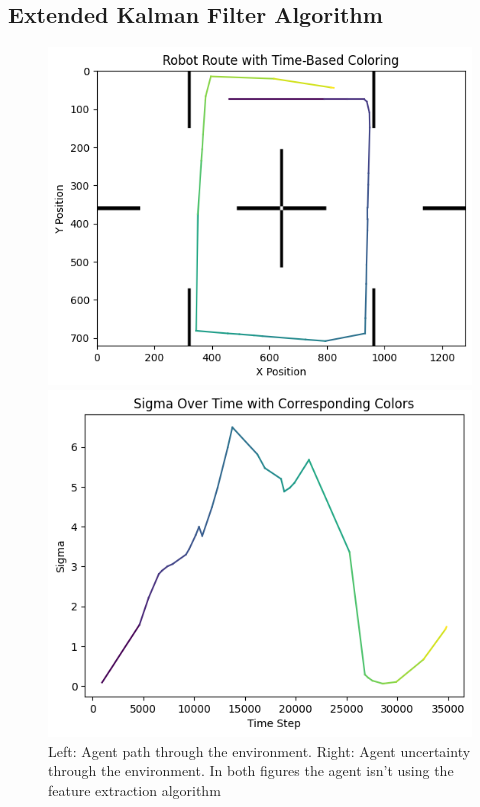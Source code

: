 \documentclass[12pt]{article}
\begin{document}
\subsection{Extended Kalman Filter Algorithm}

\begin{figure}[h]
    \centering
    \begin{minipage}{0.45\textwidth}
        \centering
        \includegraphics[width=\linewidth]{EKFgraph1}
    \end{minipage}
    \begin{minipage}{0.45\textwidth}
        \centering
        \includegraphics[width=\linewidth]{EKFgraph2}
    \end{minipage}
    \caption[Short caption]{Left: Agent path through the environment. Right: Agent uncertainty through the environment. In both figures
    the agent isn't using the feature extraction algorithm}
    \label{fig:ekf_graphs}
\end{figure}
\end{document}
